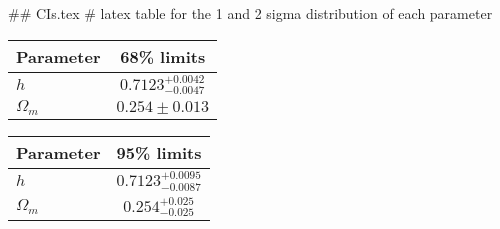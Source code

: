 ## CIs.tex
# latex table for the 1 and 2 sigma distribution of each parameter

\begin{tabular} { l  c}
 Parameter &  68\% limits\\
\hline
{\boldmath$h              $} & $0.7123^{+0.0042}_{-0.0047}$\\
{\boldmath$\Omega_m       $} & $0.254\pm 0.013            $\\
\hline
\end{tabular}

\begin{tabular} { l  c}
 Parameter &  95\% limits\\
\hline
{\boldmath$h              $} & $0.7123^{+0.0095}_{-0.0087}$\\
{\boldmath$\Omega_m       $} & $0.254^{+0.025}_{-0.025}   $\\
\hline
\end{tabular}
